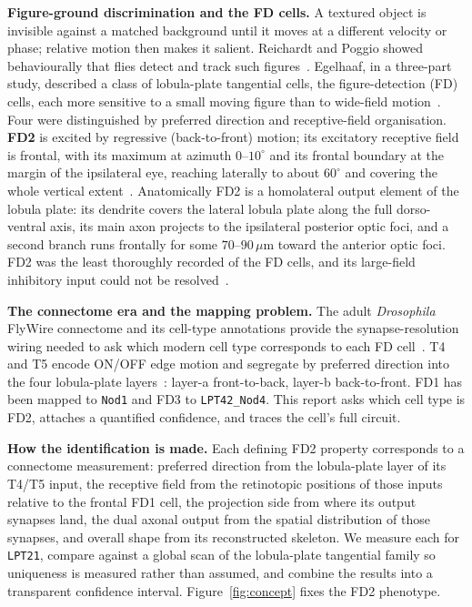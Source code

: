 \documentclass[11pt]{article}
\newcommand{\ttt}[1]{\texttt{#1}}
\begin{document}
\textbf{Figure-ground discrimination and the FD cells.}\quad
A textured object is invisible against a matched background until it moves at a different velocity or
phase; relative motion then makes it salient. Reichardt and Poggio showed behaviourally that flies
detect and track such figures~\cite{rp1979}. Egelhaaf, in a three-part study, described a class of
lobula-plate tangential cells, the figure-detection (FD) cells, each more sensitive to a small moving
figure than to wide-field motion~\cite{egelhaaf1985b}. Four were distinguished by preferred direction
and receptive-field organisation. \textbf{FD2} is excited by regressive (back-to-front) motion; its
excitatory receptive field is frontal, with its maximum at azimuth $0$--$10^\circ$ and its frontal
boundary at the margin of the ipsilateral eye, reaching laterally to about $60^\circ$ and covering the
whole vertical extent~\cite[p.~201]{egelhaaf1985b}. Anatomically FD2 is a homolateral output element
of the lobula plate: its dendrite covers the lateral lobula plate along the full dorso-ventral axis,
its main axon projects to the ipsilateral posterior optic foci, and a second branch runs frontally
for some $70$--$90\,\mu$m toward the anterior optic foci. FD2 was the least thoroughly recorded of the
FD cells, and its large-field inhibitory input could not be resolved~\cite[p.~201--202]{egelhaaf1985b}.

\textbf{The connectome era and the mapping problem.}\quad
The adult \emph{Drosophila} FlyWire connectome and its cell-type annotations provide the
synapse-resolution wiring needed to ask which modern cell type corresponds to each FD
cell~\cite{dorkenwald2024,schlegel2024,codex}. T4 and T5 encode ON/OFF edge motion and segregate by
preferred direction into the four lobula-plate layers~\cite{maisak2013,fd1989}: layer-a front-to-back,
layer-b back-to-front. FD1 has been mapped to \ttt{Nod1} and FD3 to \ttt{LPT42\_Nod4}. This report
asks which cell type is FD2, attaches a quantified confidence, and traces the cell's full circuit.

\textbf{How the identification is made.}\quad
Each defining FD2 property corresponds to a connectome measurement: preferred direction from the
lobula-plate layer of its T4/T5 input, the receptive field from the retinotopic positions of those
inputs relative to the frontal FD1 cell, the projection side from where its output synapses land, the
dual axonal output from the spatial distribution of those synapses, and overall shape from its
reconstructed skeleton. We measure each for \ttt{LPT21}, compare against a global scan of the
lobula-plate tangential family so uniqueness is measured rather than assumed, and combine the results
into a transparent confidence interval. Figure~\ref{fig:concept} fixes the FD2 phenotype.
\end{document}
